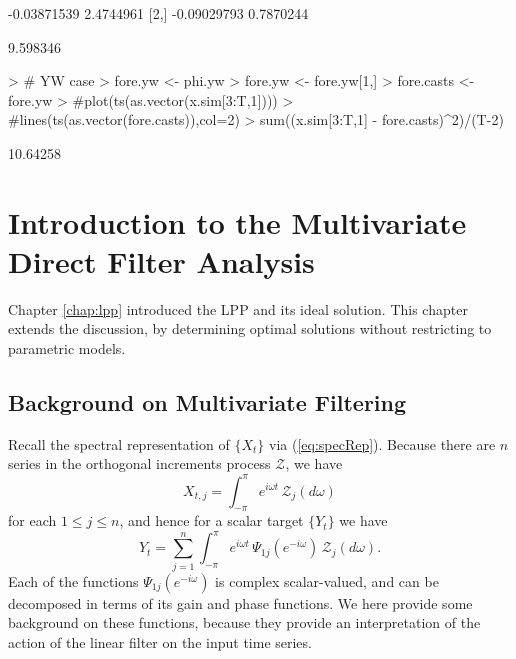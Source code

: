 \documentclass[a4paper]{book}
\begin{document}
\begin{Schunk}
\begin{Soutput}
            [,1]      [,2]
[1,] -0.03871539 2.4744961
[2,] -0.09029793 0.7870244
\end{Soutput}
\begin{Soutput}
[1] 9.598346
\end{Soutput}
\begin{Sinput}
> # YW case
> fore.yw <- phi.yw %
> fore.yw <- fore.yw[1,]
> fore.casts <- fore.yw %
> #plot(ts(as.vector(x.sim[3:T,1])))
> #lines(ts(as.vector(fore.casts)),col=2)
> sum((x.sim[3:T,1] - fore.casts)^2)/(T-2)
\end{Sinput}
\begin{Soutput}
[1] 10.64258
\end{Soutput}
\end{Schunk}





\chapter{Introduction to the Multivariate Direct Filter Analysis}
\label{chap:basic}

Chapter \ref{chap:lpp} introduced the LPP and its ideal solution.  This chapter
 extends the discussion, by determining optimal solutions without restricting
 to parametric models.

\section{Background on Multivariate Filtering}

 Recall the spectral representation of $\{ X_t \}$ via (\ref{eq:specRep}).  Because 
 there are $n$ series in the orthogonal increments process $\mathcal{Z}$, we have
\[
  X_{t,j} = \int_{-\pi}^{\pi} e^{i \omega t} \, \mathcal{Z}_j (d\omega )
\] 
 for each $1 \leq j \leq n$, and hence for a scalar target $\{ Y_t \}$ we have
\begin{equation}
 \label{eq:spec-rep.partial}
  Y_t = \sum_{j=1}^n  \int_{-\pi}^{\pi} e^{i \omega  t} \, \Psi_{1 j} (e^{-i \omega }) \,
   \mathcal{Z}_j (d\omega ).
\end{equation}
  Each of the functions $\Psi_{1j} (e^{-i \omega })$ is complex scalar-valued, and
 can be decomposed in terms of its gain and phase functions.   We here provide some
 background on these functions, because they provide an interpretation of the action
 of the linear filter on the input time series.
\end{document}
